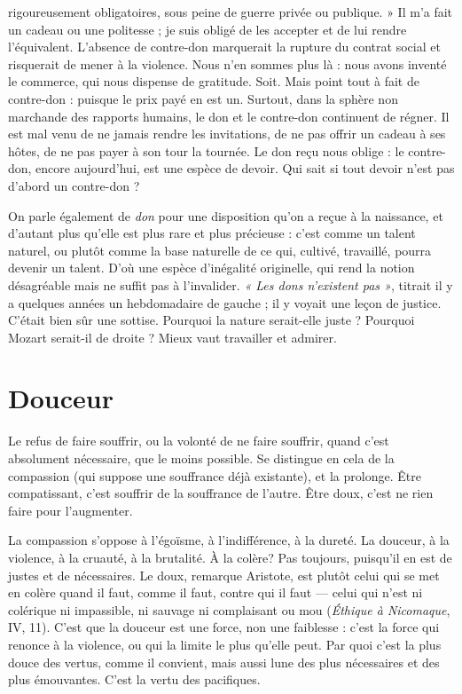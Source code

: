 rigoureusement obligatoires, sous peine de guerre privée ou publique. » Il m’a
fait un cadeau ou une politesse ; je suis obligé de les accepter et de lui rendre
l'équivalent. L'absence de contre-don marquerait la rupture du contrat social et
risquerait de mener à la violence. Nous n’en sommes plus là : nous avons
inventé le commerce, qui nous dispense de gratitude. Soit. Mais point tout à
fait de contre-don : puisque le prix payé en est un. Surtout, dans la sphère non
marchande des rapports humains, le don et le contre-don continuent de régner.
Il est mal venu de ne jamais rendre les invitations, de ne pas offrir un cadeau à
ses hôtes, de ne pas payer à son tour la tournée. Le don reçu nous oblige : le
contre-don, encore aujourd’hui, est une espèce de devoir. Qui sait si tout
devoir n’est pas d’abord un contre-don ?

On parle également de {\it don} pour une disposition qu’on a reçue à la naissance,
et d'autant plus qu’elle est plus rare et plus précieuse : c’est comme un
talent naturel, ou plutôt comme la base naturelle de ce qui, cultivé, travaillé,
pourra devenir un talent. D'où une espèce d’inégalité originelle, qui rend la
notion désagréable mais ne suffit pas à l’invalider. {\it « Les dons n'existent pas »},
titrait il y a quelques années un hebdomadaire de gauche ; il y voyait une leçon
de justice. C'était bien sûr une sottise. Pourquoi la nature serait-elle juste ?
Pourquoi Mozart serait-il de droite ? Mieux vaut travailler et admirer.

\section{Douceur}
Le refus de faire souffrir, ou la volonté de ne faire souffrir, quand
c’est absolument nécessaire, que le moins possible. Se distingue
en cela de la compassion (qui suppose une souffrance déjà existante), et la prolonge.
Être compatissant, c’est souffrir de la souffrance de l’autre. Être doux,
c’est ne rien faire pour l’augmenter.

La compassion s'oppose à l’égoïsme, à l'indifférence, à la dureté. La douceur,
à la violence, à la cruauté, à la brutalité. À la colère? Pas toujours,
puisqu'il en est de justes et de nécessaires. Le doux, remarque Aristote, est
plutôt celui qui se met en colère quand il faut, comme il faut, contre qui il faut
— celui qui n’est ni colérique ni impassible, ni sauvage ni complaisant ou mou
({\it Éthique à Nicomaque}, IV, 11). C’est que la douceur est une force, non une
faiblesse : c’est la force qui renonce à la violence, ou qui la limite le plus qu’elle
peut. Par quoi c’est la plus douce des vertus, comme il convient, mais aussi
lune des plus nécessaires et des plus émouvantes. C’est la vertu des pacifiques.

